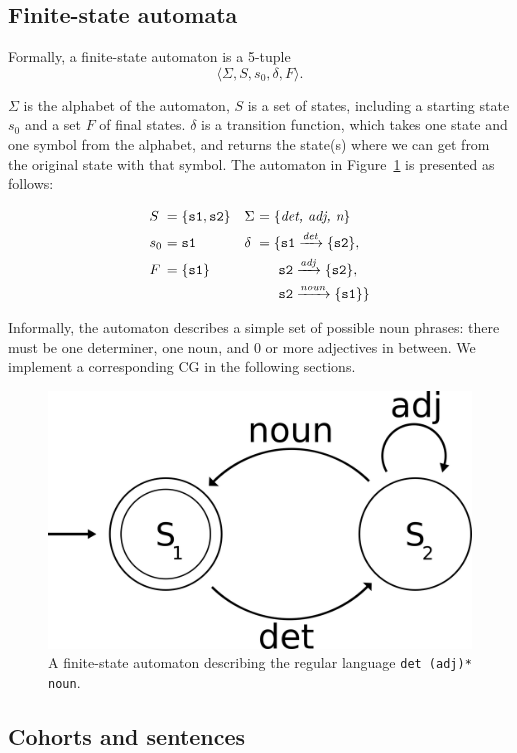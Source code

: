\documentclass[11pt]{article}
\def\t#1{\texttt{#1}}
\begin{document}
\subsection{Finite-state automata}
Formally, a finite-state automaton is a 5-tuple
\[
  \langle \Sigma, S, s_0, \delta, F \rangle.
\]


$\Sigma$ is the alphabet of the automaton, $S$ is a set of states,
including a starting state $s_0$ and a set $F$ of final states.
$\delta$ is a transition function, which takes one state and one
symbol from the alphabet, and returns the state(s) where we can get
from the original state with that symbol.
The automaton in Figure~\ref{fig:fsa} is presented as follows:

\[\!
\begin{aligned}
  &S&      \!\!\!\!=\;& \{\t{s1}, \t{s2}\}  &&\Sigma& \!\!\!\!=\;& \{\emph{det, adj, n}\} \\
  &s_0&    \!\!\!\!=\;& \t{s1}              &&\delta& \!\!\!\!=\;& \{\t{s1} \xrightarrow{\text{\em det}} \{\t{s2}\},  \\ 
  &F&      \!\!\!\!=\;& \{\t{s1}\}          &&      & \!\!\!\! \;& \ \t{s2} \xrightarrow{\text{\em adj}} \{\t{s2}\}, \\
  & &                 &                     &&      & \!\!\!\! \;& \ \t{s2} \xrightarrow{\text{\em noun}} \{\t{s1}\} \} \\
\end{aligned}
\]

Informally, the automaton describes a simple set of possible noun
phrases: there must be one determiner, one noun, and 0 or more
adjectives in between. 
We implement a corresponding CG in the following sections.

\begin{figure}[t]
  \centering
  \includegraphics[width=0.6\linewidth]{fsa.png}
  \caption{A finite-state automaton describing the regular language \t{det
      (adj)* noun}.}
 \label{fig:fsa}
\end{figure}


\subsection{Cohorts and sentences}
\end{document}
